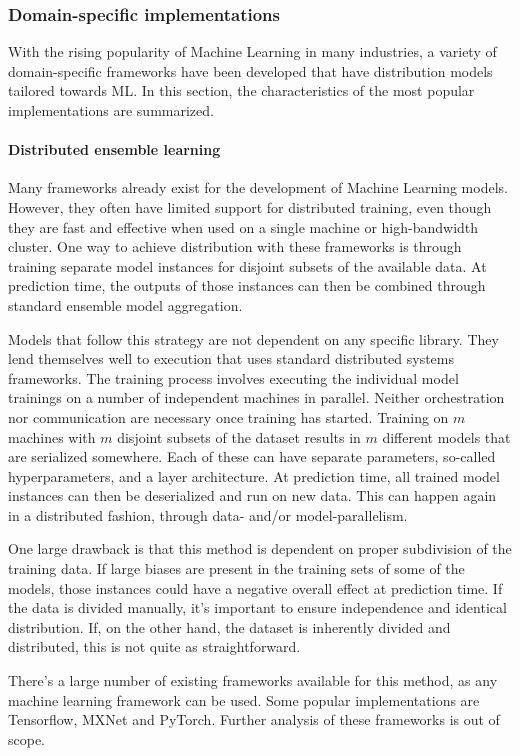 \subsubsection{Domain-specific implementations}
With the rising popularity of Machine Learning in many industries, a variety of domain-specific frameworks have been developed that have distribution models tailored towards ML. In this section, the characteristics of the most popular implementations are summarized.

\paragraph{Distributed ensemble learning}
Many frameworks already exist for the development of Machine Learning models. However, they often have limited support for distributed training, even though they are fast and effective when used on a single machine or high-bandwidth cluster. One way to achieve distribution with these frameworks is through training separate model instances for disjoint subsets of the available data. At prediction time, the outputs of those instances can then be combined through standard ensemble model aggregation\citep{Opitz1999}.

Models that follow this strategy are not dependent on any specific library. They lend themselves well to execution that uses standard distributed systems frameworks. The training process involves executing the individual model trainings on a number of independent machines in parallel. Neither orchestration nor communication are necessary once training has started. Training on $m$ machines with $m$ disjoint subsets of the dataset results in $m$ different models that are serialized somewhere. Each of these can have separate parameters, so-called hyperparameters, and a layer architecture. At prediction time, all trained model instances can then be deserialized and run on new data. This can happen again in a distributed fashion, through data- and/or model-parallelism.

One large drawback is that this method is dependent on proper subdivision of the training data. If large biases are present in the training sets of some of the models, those instances could have a negative overall effect at prediction time. If the data is divided manually, it's important to ensure independence and identical distribution. If, on the other hand, the dataset is inherently divided and distributed, this is not quite as straightforward.

There's a large number of existing frameworks available for this method, as any machine learning framework can be used. Some popular implementations are Tensorflow\citep{Tensorflow2015}, MXNet\citep{MXNet2015} and PyTorch\citep{PyTorch2017}. Further analysis of these frameworks is out of scope.

